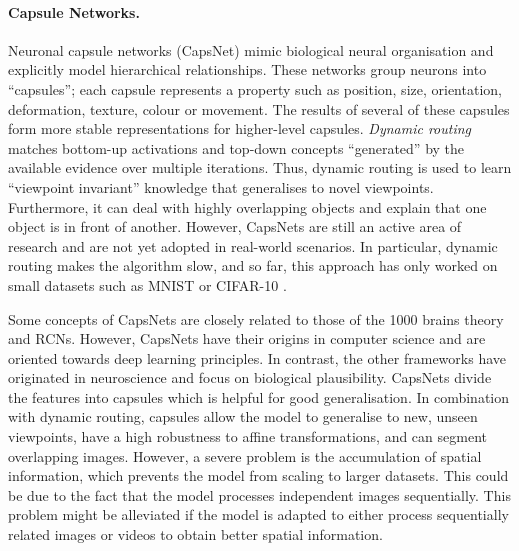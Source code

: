 \paragraph{Capsule Networks.} Neuronal capsule networks (CapsNet)  mimic biological neural organisation and explicitly model hierarchical relationships. These networks group neurons into ``capsules''; each capsule represents a property such as position, size, orientation, deformation, texture, colour or movement. The results of several of these capsules form more stable representations for higher-level capsules. \emph{Dynamic routing} matches bottom-up activations and top-down concepts ``generated'' by the available evidence over multiple iterations. Thus, dynamic routing is used to learn ``viewpoint invariant'' knowledge that generalises to novel viewpoints.
Furthermore, it can deal with highly overlapping objects and explain that one object is in front of another. However, CapsNets are still an active area of research and are not yet adopted in real-world scenarios. In particular, dynamic routing makes the algorithm slow, and so far, this approach has only worked on small datasets such as MNIST  or CIFAR-10 .

Some concepts of CapsNets are closely related to those of the 1000 brains theory and RCNs. However, CapsNets have their origins in computer science and are oriented towards deep learning principles. In contrast, the other frameworks have originated in neuroscience and focus on biological plausibility. CapsNets divide the features into capsules which is helpful for good generalisation. In combination with dynamic routing, capsules allow the model to generalise to new, unseen viewpoints, have a high robustness to affine transformations, and can segment overlapping images. However, a severe problem is the accumulation of spatial information, which prevents the model from scaling to larger datasets. This could be due to the fact that the model processes independent images sequentially. This problem might be alleviated if the model is adapted to either process sequentially related images or videos to obtain better spatial information.

